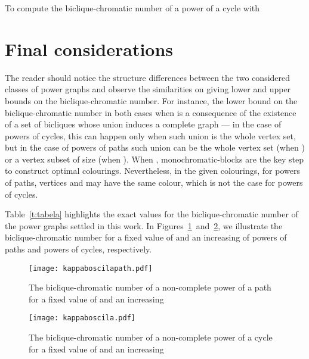 \documentclass{article}
\begin{document}
	\begin{algorithm}[t]
	\label{alg:numerobicliquecromaticopowerofcycle}
	\caption{To compute the biclique-chromatic number of a power of a cycle 
	with }
	\BlankLine
	\Begin
	{	
		\;
		\;
		{
				\Return{\;}
		}
		{
			\;
			\;
			{
					\Return{\;}
			}
			{
				\Return{\;}
			}
		}
	}
	\end{algorithm}

\section{Final considerations}
\label{sec:final}

The reader should notice the structure differences between the two
considered classes of power graphs and observe the similarities on giving lower
and upper bounds on the biclique-chromatic number. For instance,
the lower bound on the biclique-chromatic number in both cases when  
is a consequence of the existence of a set of  bicliques whose union
induces a complete graph --- in the case of powers of cycles, this can happen
only when such union is the whole vertex set, but in the case of powers of
paths such union can be the whole vertex set (when ) or a
vertex subset of size  (when ). When , monochromatic-blocks are the key step to construct optimal colourings. 
Nevertheless, in the given colourings, for powers of
paths, vertices  and  may have the same colour, which is not the
case for powers of cycles.

Table~\ref{t:tabela} highlights the exact values for the biclique-chromatic
number of the power graphs settled in this work. In
Figures~\ref{fig:kappaboscilapath}~and~\ref{fig:kappaboscilacycle}, we illustrate
the biclique-chromatic number for a fixed value of  and an increasing  of
powers of paths and powers of cycles, respectively.

\begin{figure}[t]
\centering
	\texttt{[image: kappaboscilapath.pdf]}
	\caption{The biclique-chromatic number of a non-complete power of a path for a fixed value of
	 and an increasing }
	\label{fig:kappaboscilapath}
\end{figure}

\begin{figure}[t]
\centering
	\texttt{[image: kappaboscila.pdf]}
	\caption{The biclique-chromatic number of a non-complete power of a cycle for a fixed value
	of  and an increasing }
	\label{fig:kappaboscilacycle}
\end{figure}
\end{document}
